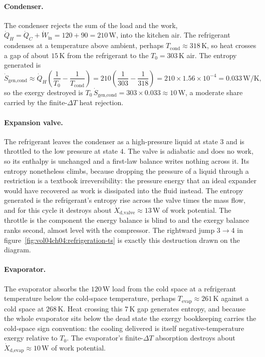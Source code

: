 \paragraph{Condenser.} The condenser rejects the sum of the load and the
work, $\dot Q_H = \dot Q_C + \dot W_{\text{in}} = 120 + 90 =
210\,\text{W}$, into the kitchen air. The refrigerant condenses at a
temperature above ambient, perhaps $T_{\text{cond}} \approx 318\,\si{\kelvin}$,
so heat crosses a gap of about $15\,\si{\kelvin}$ from the refrigerant to
the $T_0 = 303\,\si{\kelvin}$ air. The entropy generated is
\[
\dot S_{\text{gen,cond}} \approx \dot Q_H
\left(\frac{1}{T_0} - \frac{1}{T_{\text{cond}}}\right)
= 210\left(\frac{1}{303} - \frac{1}{318}\right)
= 210 \times 1.56\times10^{-4}
= 0.033\,\si{\watt\per\kelvin},
\]
so the exergy destroyed is $T_0\,\dot S_{\text{gen,cond}} = 303 \times
0.033 \approx 10\,\text{W}$, a moderate share carried by the
finite-$\Delta T$ heat rejection.

\paragraph{Expansion valve.} The refrigerant leaves the condenser as a
high-pressure liquid at state $3$ and is throttled to the low pressure at
state $4$. The valve is adiabatic and does no work, so its enthalpy is
unchanged and a first-law balance writes nothing across it. Its entropy
nonetheless climbs, because dropping the pressure of a liquid through a
restriction is a textbook irreversibility: the pressure energy that an
ideal expander would have recovered as work is dissipated into the
fluid instead. The entropy generated is the refrigerant's entropy rise
across the valve times the mass flow, and for this cycle it destroys
about $\dot X_{\text{d,valve}} \approx 13\,\text{W}$ of work potential.
The throttle is the component the energy balance is blind to and the
exergy balance ranks second, almost level with the compressor. The
rightward jump $3 \!\to\! 4$ in
figure~\ref{fig:vol04ch04:refrigeration-ts} is exactly this destruction
drawn on the diagram.

\paragraph{Evaporator.} The evaporator absorbs the $120\,\text{W}$ load
from the cold space at a refrigerant temperature below the cold-space
temperature, perhaps $T_{\text{evap}} \approx 261\,\si{\kelvin}$ against a
cold space at $268\,\si{\kelvin}$. Heat crossing this $7\,\si{\kelvin}$
gap generates entropy, and because the whole evaporator sits below the
dead state the exergy bookkeeping carries the cold-space sign convention:
the cooling delivered is itself negative-temperature exergy relative to
$T_0$. The evaporator's finite-$\Delta T$ absorption destroys about
$\dot X_{\text{d,evap}} \approx 10\,\text{W}$ of work potential.

